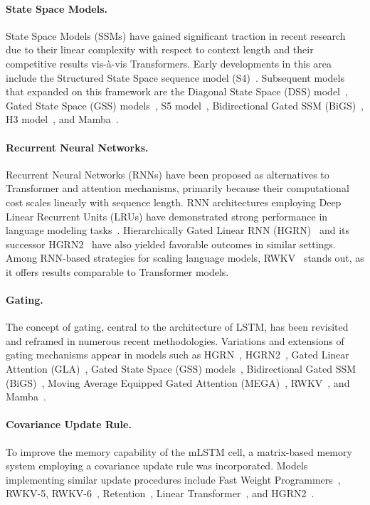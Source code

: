 \paragraph{State Space Models.} State Space Models (SSMs) have gained significant traction in recent research due to their linear complexity with respect to context length and their competitive results vis-à-vis Transformers. Early developments in this area include the Structured State Space sequence model (S4)~\citep{Gu:21}. Subsequent models that expanded on this framework are the Diagonal State Space (DSS) model~\citep{Gupta:22}, Gated State Space (GSS) models~\citep{Mehta:22}, S5 model~\citep{Smith:22}, Bidirectional Gated SSM (BiGS)~\citep{Wang:22}, H3 model~\citep{Fu:23}, and Mamba~\citep{Gu:24arxiv}.

\paragraph{Recurrent Neural Networks.} Recurrent Neural Networks (RNNs) have been proposed as alternatives to Transformer and attention mechanisms, primarily because their computational cost scales linearly with sequence length. RNN architectures employing Deep Linear Recurrent Units (LRUs) have demonstrated strong performance in language modeling tasks~\citep{Orvieto:23, De:24arxiv}. Hierarchically Gated Linear RNN (HGRN)~\citep{Qin:23} and its successor HGRN2~\citep{Qin:24arxiv} have also yielded favorable outcomes in similar settings. Among RNN-based strategies for scaling language models, RWKV~\citep{Peng:23arxivshort,Peng:24arxivshort} stands out, as it offers results comparable to Transformer models.

\paragraph{Gating.}
The concept of gating, central to the architecture of LSTM, has been revisited and reframed in numerous recent methodologies. Variations and extensions of gating mechanisms appear in models such as HGRN~\citep{Qin:23}, HGRN2~\citep{Qin:24arxiv}, Gated Linear Attention (GLA)~\citep{Yang:23arxiv}, Gated State Space (GSS) models~\citep{Mehta:22}, Bidirectional Gated SSM (BiGS)~\citep{Wang:22}, Moving Average Equipped Gated Attention (MEGA)~\citep{Ma:22}, RWKV~\citep{Peng:23arxivshort}, and Mamba~\citep{Gu:24arxiv}.

\paragraph{Covariance Update Rule.}
To improve the memory capability of the mLSTM cell, a matrix-based memory system employing a covariance update rule was incorporated. Models implementing similar update procedures include Fast Weight Programmers~\citep{Schmidhuber:92ncfastweights,Schlag:21}, RWKV-5, RWKV-6~\citep{Peng:24arxivshort}, Retention~\citep{Sun:23arxiv}, Linear Transformer~\citep{Katharopoulos:20}, and HGRN2~\citep{Qin:24arxiv}.

